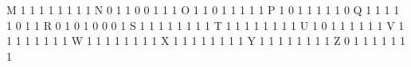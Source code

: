 \documentclass[12pt,a4paper,english]{article}
\begin{document}
\begin{itemize}
			M\hspace{0.72in}		1	1	1	1	1	1	1	1\newline
			N\hspace{0.72in}		0	1	1	0	0	1	1	1\newline
			O\hspace{0.72in}		1	1	0	1	1	1	1	1\newline
			P\hspace{0.72in}		1	0	1	1	1	1	1	0\newline
			Q\hspace{0.72in}		1	1	1	1	1	0	1	1\newline
			R\hspace{0.72in}		0	1	0	1	0	0	0	1\newline
			S\hspace{0.72in}		1	1	1	1	1	1	1	1\newline
			T\hspace{0.72in}		1	1	1	1	1	1	1	1\newline
			U\hspace{0.72in}		1	0	1	1	1	1	1	1\newline
			V\hspace{0.72in}		1	1	1	1	1	1	1	1\newline
			W\hspace{0.66in}		1	1	1	1	1	1	1	1\newline
			X\hspace{0.72in}		1	1	1	1	1	1	1	1\newline
			Y\hspace{0.72in}		1	1	1	1	1	1	1	1\newline
			Z\hspace{0.75in}		0	1	1	1	1	1	1	1\newline
			
		
		\end{itemize}
\end{document}
